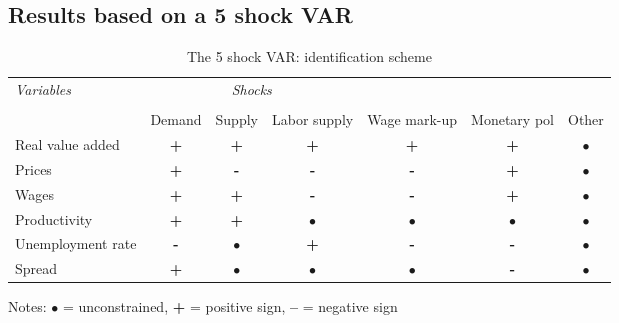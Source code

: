 \documentclass[11pt]{article}
\begin{document}
\begin{appendices}
\clearpage
\pagebreak

\section{Results based on a 5 shock VAR}
\label{AppendixSVAR6}


\begin{table}[!h]
\tiny
\begin{center}
\caption{The 5 shock VAR: identification scheme}
\vskip 0.5cm
\label{tab: identification2}
\begin{tabular}{lcccccc}
\toprule
\textit{Variables} & \multicolumn{3}{c}{\textit{Shocks}} \\ \\[-1ex]
& Demand   & Supply & Labor supply & Wage mark-up & Monetary pol & Other \\

Real value added & \textbf{+} & \textbf{+} & \textbf{+} & \textbf{+} & \textbf{+} & $\bullet$ \\
Prices & \textbf{+} & \textbf{-} & \textbf{-} & \textbf{-} & \textbf{+} & $\bullet$ \\
Wages & \textbf{+} & \textbf{+} & \textbf{-} & \textbf{-} & \textbf{+} & $\bullet$ \\
Productivity & \textbf{+} & \textbf{+} & $\bullet$ & $\bullet$ & $\bullet$ & $\bullet$ \\
Unemployment rate & \textbf{-} & $\bullet$ & \textbf{+} & \textbf{-} & \textbf{-} & $\bullet$ \\
Spread & \textbf{+} & $\bullet$ & $\bullet$ & $\bullet$ & \textbf{-} & $\bullet$ \\
\end{tabular}
\end{center}
\par
{\small \begin{center}Notes: $\bullet$ = unconstrained, \textbf{+} = positive sign,
\textbf{--} = negative sign \end{center}}
\end{table}




\end{appendices}
\end{document}
